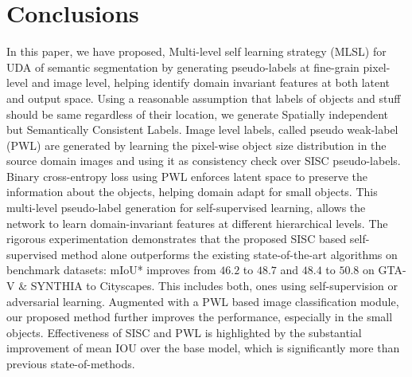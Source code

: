 \documentclass[10pt,twocolumn,letterpaper]{article}
\begin{document}
\section{Conclusions}
\vspace{-0.2cm}
In this paper, we have proposed,  Multi-level self learning strategy (MLSL) for UDA of semantic segmentation by generating pseudo-labels at fine-grain pixel-level and image level, helping identify domain invariant features at both latent and output space.
Using a reasonable assumption that labels of objects and stuff should be same regardless of their location, we generate Spatially independent but Semantically Consistent Labels.
Image level labels, called pseudo weak-label (PWL)  are generated by learning the pixel-wise object size distribution in the source domain images and using it as consistency check over SISC pseudo-labels.
Binary cross-entropy loss using PWL enforces latent space to preserve the information about the objects, helping domain adapt for small objects. 
This multi-level pseudo-label generation for self-supervised learning, allows the network to learn domain-invariant features at different hierarchical levels. 
The rigorous experimentation demonstrates that the proposed SISC based self-supervised method alone outperforms the existing state-of-the-art algorithms on benchmark datasets: mIoU* improves from $46.2$ to $48.7$ and $48.4$ to $50.8$ on GTA-V $\&$ SYNTHIA to Cityscapes. This includes both,  ones using self-supervision or adversarial learning. 
Augmented with a PWL based image classification module, our proposed method further improves the performance, especially in the small objects. 
Effectiveness of SISC and PWL is highlighted by the substantial improvement of mean IOU over the base model, which is significantly more than previous state-of-methods.




{\small


}
\end{document}
